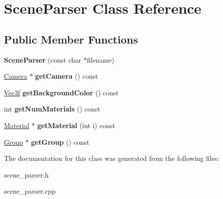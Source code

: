 \hypertarget{classSceneParser}{\section{\-Scene\-Parser \-Class \-Reference}
\label{classSceneParser}
}
\subsection*{\-Public \-Member \-Functions}
\begin{DoxyCompactItemize}
\item 
\hypertarget{classSceneParser_ad88a09b16ec8ebbe49a8fd70e14216cf}{{\bfseries \-Scene\-Parser} (const char $\ast$filename)}\label{classSceneParser_ad88a09b16ec8ebbe49a8fd70e14216cf}

\item 
\hypertarget{classSceneParser_a9fbeeca8f642f40ade54674a41265115}{\hyperlink{classCamera}{\-Camera} $\ast$ {\bfseries get\-Camera} () const }\label{classSceneParser_a9fbeeca8f642f40ade54674a41265115}

\item 
\hypertarget{classSceneParser_a4254064ea79ff601d72d77bc3affb131}{\hyperlink{classVec3f}{\-Vec3f} {\bfseries get\-Background\-Color} () const }\label{classSceneParser_a4254064ea79ff601d72d77bc3affb131}

\item 
\hypertarget{classSceneParser_ae5c6cca64c7bd4f7b9b19c5bb381c801}{int {\bfseries get\-Num\-Materials} () const }\label{classSceneParser_ae5c6cca64c7bd4f7b9b19c5bb381c801}

\item 
\hypertarget{classSceneParser_aadffb5793d5dc58507d20eabb617c6d6}{\hyperlink{classMaterial}{\-Material} $\ast$ {\bfseries get\-Material} (int i) const }\label{classSceneParser_aadffb5793d5dc58507d20eabb617c6d6}

\item 
\hypertarget{classSceneParser_ab7035d29d61e4dfdf64f1e1b4f157b54}{\hyperlink{classGroup}{\-Group} $\ast$ {\bfseries get\-Group} () const }\label{classSceneParser_ab7035d29d61e4dfdf64f1e1b4f157b54}

\end{DoxyCompactItemize}


\-The documentation for this class was generated from the following files\-:\begin{DoxyCompactItemize}
\item 
scene\-\_\-parser.\-h\item 
scene\-\_\-parser.\-cpp\end{DoxyCompactItemize}
